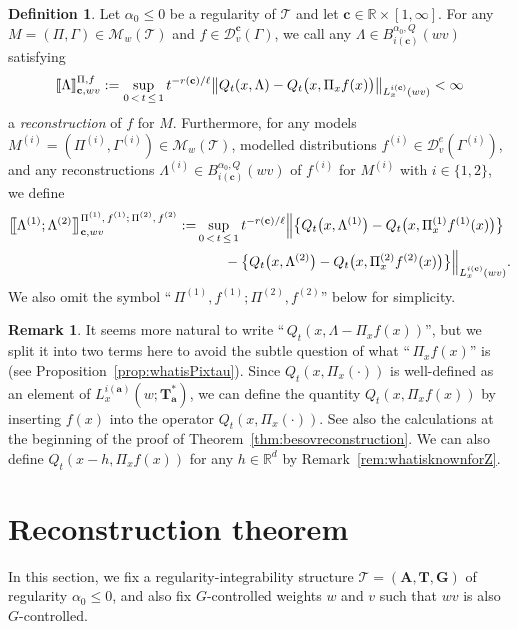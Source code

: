 \documentclass[10pt]{amsart}
\theoremstyle{definition}
\newtheorem{defi}[theo]{Definition}
\newtheorem{rema}[theo]{Remark}
\numberwithin{equation}{section}
\newcommand{\bbR}{\mathbb{R}}
\newcommand{\bfa}{\mathbf{a}}
\newcommand{\bfc}{\mathbf{c}}
\newcommand{\bfA}{\mathbf{A}}
\newcommand{\bfT}{\mathbf{T}}
\newcommand{\bfG}{\mathbf{G}}
\newcommand{\mcD}{\mathcal{D}}
\newcommand{\scT}{\mathscr{T}}
\newcommand{\scM}{\mathscr{M}}
\newcommand{\llbracket}{\mathopen{[\mkern -2.7mu[}}
\newcommand{\rrbracket}{\mathclose{]\mkern -2.7mu]}}
\newcommand{\lb}{\llbracket}
\newcommand{\rb}{\rrbracket}
\newcommand{\llbigbracket}{\mathopen{\big[\mkern -4.2mu\big[}}
\newcommand{\rrbigbracket}{\mathclose{\big]\mkern -4.2mu\big]}}
\newcommand{\lbb}{\llbigbracket}
\newcommand{\rbb}{\rrbigbracket}
\begin{document}
\begin{defi}\label{def:besovreconst}
Let $\alpha_0\le0$ be a regularity of $\scT$ and let $\bfc\in\bbR\times[1,\infty]$. For any $M=(\Pi,\Gamma)\in\scM_{w}(\scT)$ and $f\in\mcD_{v}^\bfc(\Gamma)$, we call any $\Lambda\in B_{i(\bfc)}^{\alpha_0,Q}(wv)$ satisfying
\begin{align*}
\lb\Lambda\rb_{\bfc,wv}^{\Pi,f}:=\sup_{0\,<\,t\,\le\,1}t^{-r(\bfc)/\ell}\big\|Q_t(x,\Lambda)-Q_t\big(x,\Pi_xf(x)\big)\big\|_{L_x^{i(\bfc)}(wv)}<\infty
\end{align*}
a \emph{reconstruction} of $f$ for $M$. Furthermore, for any models $M^{(i)}=(\Pi^{(i)},\Gamma^{(i)})\in\scM_{w}(\scT)$, modelled distributions $f^{(i)}\in\mcD_{v}^e(\Gamma^{(i)})$, and any reconstructions $\Lambda^{(i)}\in B_{i(\bfc)}^{\alpha_0,Q}(wv)$ of $f^{(i)}$ for $M^{(i)}$ with $i\in\{1,2\}$, we define
\begin{align*}
\lbb\Lambda^{(1)};\Lambda^{(2)}\rbb_{\bfc,wv}^{\Pi^{(1)},\,f^{(1)};\,\Pi^{(2)},\,f^{(2)}} :=&\sup_{0\,<\,t\,\le\,1}t^{-r(\bfc)/\ell}\Big\|\big\{Q_t\big(x,\Lambda^{(1)}\big)-Q_t\big(x,\Pi_x^{(1)}f^{(1)}(x)\big)\big\}\\
&\qquad-\big\{Q_t\big(x,\Lambda^{(2)}\big)-Q_t\big(x,\Pi_x^{(2)}f^{(2)}(x)\big)\big\}\Big\|_{L_x^{i(\bfc)}(wv)}.
\end{align*}
We also omit the symbol ``$\,\Pi^{(1)},f^{(1)};\Pi^{(2)},f^{(2)}$'' below for simplicity.
\end{defi}

\begin{rema}\label{rem:L-Pixfx}
It seems more natural to write ``$\, Q_t(x,\Lambda-\Pi_xf(x))$'', but we split it into two terms here to avoid the subtle question of what ``$\, \Pi_xf(x)$'' is (see Proposition~\ref{prop:whatisPixtau}). Since $Q_t(x,\Pi_x(\cdot))$ is well-defined as an element of $L_x^{i(\bfa)}(w;\bfT_\bfa^*)$, we can define the quantity $Q_t(x,\Pi_xf(x))$ by inserting $f(x)$ into the operator $Q_t(x,\Pi_x(\cdot))$. See also the calculations at the beginning of the proof of Theorem~\ref{thm:besovreconstruction}. We can also define $Q_t(x-h,\Pi_xf(x))$ for any $h\in\bbR^d$ by Remark~\ref{rem:whatisknownforZ}.
\end{rema}

\section{Reconstruction theorem}\label{section:reconstruction}


In this section, we fix a regularity-integrability structure $\scT=(\bfA,\bfT,\bfG)$ of regularity $\alpha_0\le0$, and also fix $G$-controlled weights $w$ and $v$ such that $wv$ is also $G$-controlled.
\end{document}
